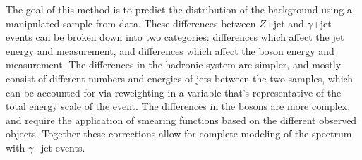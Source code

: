 The goal of this method is to predict the \met distribution of the \dyjets background using a manipulated \gjets sample from data. These differences between $Z$+jet and $\gamma$+jet events can be broken down into two categories: differences which affect the jet energy and measurement, and differences which affect the boson energy and measurement. The differences in the hadronic system are simpler, and mostly consist of different numbers and energies of jets between the two samples, which can be accounted for via reweighting in a variable that's representative of the total energy scale of the event. The differences in the bosons are more complex, and require the application of smearing functions based on the different observed objects. Together these corrections allow for complete modeling of the \dyjets \met spectrum with $\gamma$+jet events.


